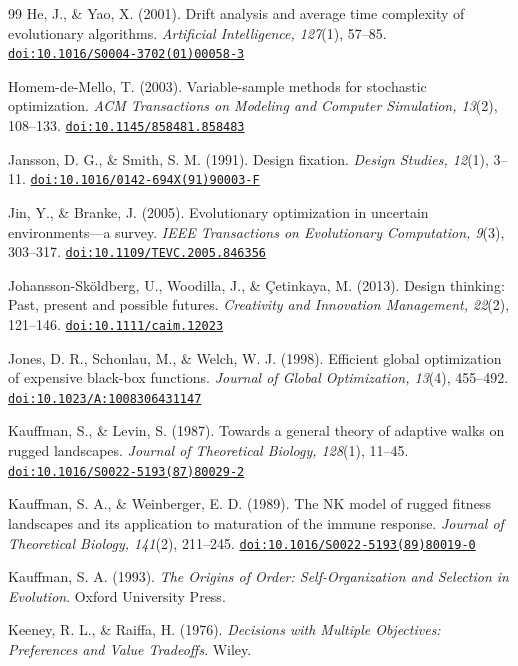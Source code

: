 \documentclass[preprint,review,11pt,authoryear]{elsarticle}
\providecommand{\doi}[1]{\href{https://doi.org/#1}{\nolinkurl{doi:#1}}}
\theoremstyle{definition}
\begin{document}
\begin{thebibliography}{99}
 He, J., \& Yao, X. (2001). Drift analysis and average time complexity of evolutionary algorithms. \textit{Artificial Intelligence, 127}(1), 57--85. \doi{10.1016/S0004-3702(01)00058-3}

 Homem-de-Mello, T. (2003). Variable-sample methods for stochastic optimization. \textit{ACM Transactions on Modeling and Computer Simulation, 13}(2), 108--133. \doi{10.1145/858481.858483}

 Jansson, D. G., \& Smith, S. M. (1991). Design fixation. \textit{Design Studies, 12}(1), 3--11. \doi{10.1016/0142-694X(91)90003-F}

 Jin, Y., \& Branke, J. (2005). Evolutionary optimization in uncertain environments---a survey. \textit{IEEE Transactions on Evolutionary Computation, 9}(3), 303--317. \doi{10.1109/TEVC.2005.846356}

 Johansson-Sk{\"o}ldberg, U., Woodilla, J., \& \c{C}etinkaya, M. (2013). Design thinking: Past, present and possible futures. \textit{Creativity and Innovation Management, 22}(2), 121--146. \doi{10.1111/caim.12023}

 Jones, D. R., Schonlau, M., \& Welch, W. J. (1998). Efficient global optimization of expensive black-box functions. \textit{Journal of Global Optimization, 13}(4), 455--492. \doi{10.1023/A:1008306431147}

 Kauffman, S., \& Levin, S. (1987). Towards a general theory of adaptive walks on rugged landscapes. \textit{Journal of Theoretical Biology, 128}(1), 11--45. \doi{10.1016/S0022-5193(87)80029-2}

 Kauffman, S. A., \& Weinberger, E. D. (1989). The NK model of rugged fitness landscapes and its application to maturation of the immune response. \textit{Journal of Theoretical Biology, 141}(2), 211--245. \doi{10.1016/S0022-5193(89)80019-0}

 Kauffman, S. A. (1993). \textit{The Origins of Order: Self-Organization and Selection in Evolution}. Oxford University Press.

 Keeney, R. L., \& Raiffa, H. (1976). \textit{Decisions with Multiple Objectives: Preferences and Value Tradeoffs}. Wiley.


\end{thebibliography}
\end{document}
